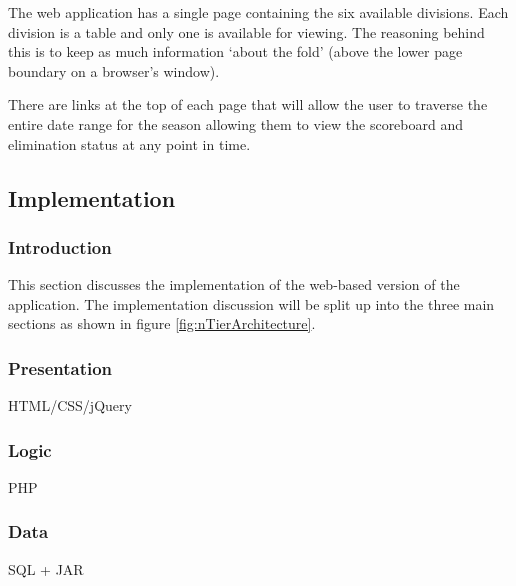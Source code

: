 The web application has a single page containing the six available divisions.
Each division is a table and only one is available for viewing. The reasoning
behind this is to keep as much information `about the fold' (above the lower
page boundary on a browser's window).

There are links at the top of each page that will allow the user to traverse
the entire date range for the season allowing them to view the scoreboard and
elimination status at any point in time.

\subsection{Implementation}

\subsubsection{Introduction}

This section discusses the implementation of the web-based version of the
application. The implementation discussion will be split up into the three
main sections as shown in figure \ref{fig:nTierArchitecture}.

\subsubsection{Presentation}

HTML/CSS/jQuery

\subsubsection{Logic}

PHP

\subsubsection{Data}

SQL + JAR
